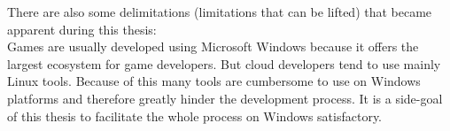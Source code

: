 There are also some delimitations (limitations that can be lifted) that became
apparent during this thesis:\\

Games are usually developed using Microsoft Windows because it offers the
largest ecosystem for game developers. But cloud developers tend to use mainly
Linux tools. Because of this many tools are cumbersome to use on Windows
platforms and therefore greatly hinder the development process. It is a
side-goal of this thesis to facilitate the whole process on Windows
satisfactory.\\





















